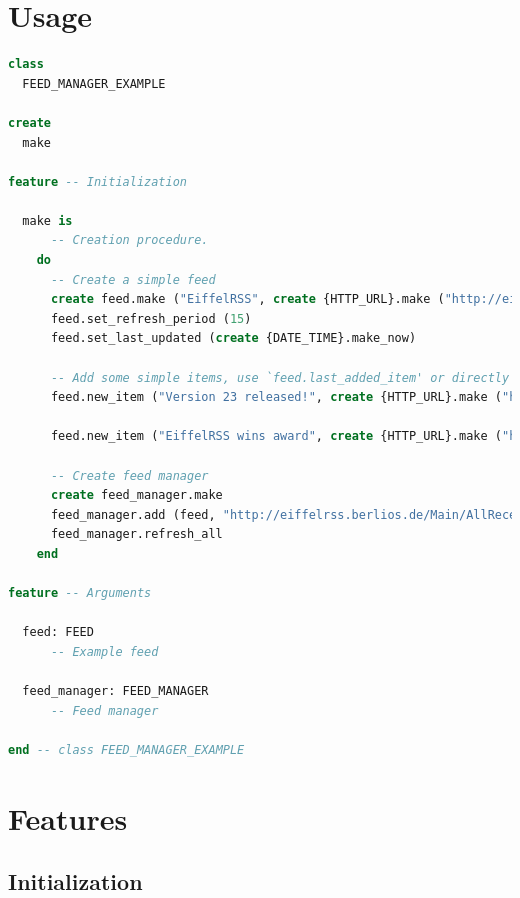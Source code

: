 \section{Usage}
\label{sec:feed-manager-usage}

\begin{lstlisting}[language=Eiffel]
class
  FEED_MANAGER_EXAMPLE

create
  make

feature -- Initialization

  make is
      -- Creation procedure.
    do
      -- Create a simple feed
      create feed.make ("EiffelRSS", create {HTTP_URL}.make ("http://eiffelrss.berlios.de"), "EiffelRSS news")
      feed.set_refresh_period (15)
      feed.set_last_updated (create {DATE_TIME}.make_now)
      
      -- Add some simple items, use `feed.last_added_item' or directly create an item for finer control
      feed.new_item ("Version 23 released!", create {HTTP_URL}.make ("http://eiffelrss.berlios.de/Main/News"), "Version 23 of EiffelRSS got release today. Happy syndicating!")

      feed.new_item ("EiffelRSS wins award", create {HTTP_URL}.make ("http://eiffelrss.berlios.de/Main/Awards"), "EiffelRSS has been awarded by ISE as best syndication software written in Eiffel. For more info see award-winning pages: http://eiffelrss.berlios.de")

      -- Create feed manager
      create feed_manager.make
      feed_manager.add (feed, "http://eiffelrss.berlios.de/Main/AllRecentChanges?action=rss")
      feed_manager.refresh_all
    end
    
feature -- Arguments

  feed: FEED
      -- Example feed
      
  feed_manager: FEED_MANAGER
      -- Feed manager

end -- class FEED_MANAGER_EXAMPLE
\end{lstlisting}

\newpage

\section{Features}
\label{sec:feed-manager-features}

\subsection{Initialization}
\label{sec:feed-manager-initialization}

